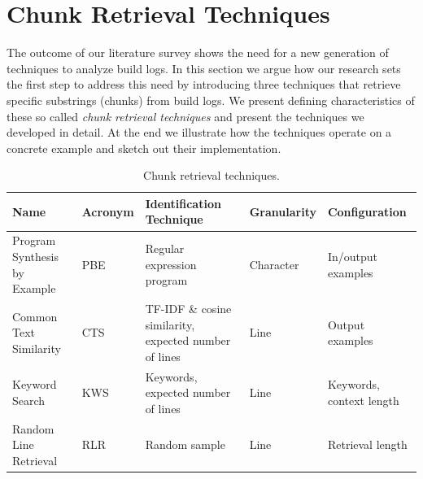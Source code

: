 



\section{Chunk Retrieval Techniques}
\label{sec:techniques}
The outcome of our literature survey shows the need for a new
generation of techniques to analyze build logs.
In this section we argue how our research sets the first step to
address this need by introducing three techniques that retrieve
specific substrings (chunks) from build logs.
We present defining characteristics of these so called \emph{chunk
retrieval techniques} and present the techniques we developed in
detail.
At the end we illustrate how the techniques operate on a concrete
example and sketch out their implementation.

\begin{table}[htb]
\centering
\caption{Chunk retrieval techniques.}
\begin{tabularx}{\textwidth}{@{}llXll@{}}
\toprule
Name			     & Acronym & Identification Technique
& Granularity & Configuration \\
\midrule
Program Synthesis by Example & PBE     & Regular expression program
& Character   & In/output examples	\\
Common Text Similarity	     & CTS     & TF-IDF \& cosine similarity,
expected number of lines & Line        & Output examples	   \\
Keyword Search		     & KWS     & Keywords, expected number of
lines			 & Line        & Keywords, context length  \\
Random Line Retrieval	     & RLR     & Random sample
& Line	      & Retrieval length	  \\
\bottomrule
\end{tabularx}
\label{tab:techniques}
\end{table}

